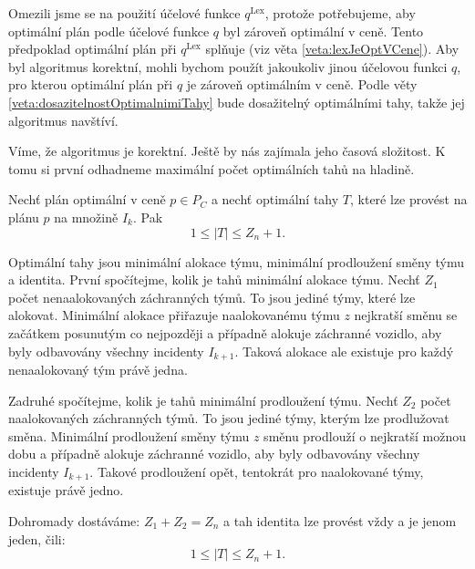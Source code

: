 Omezili jsme se na použití účelové funkce $q^{\text{Lex}}$, protože potřebujeme, aby optimální plán podle účelové funkce $q$ byl zároveň optimální v ceně.
Tento předpoklad optimální plán při $q^{\text{Lex}}$ splňuje (viz věta \ref{veta:lexJeOptVCene}).
Aby byl algoritmus korektní, mohli bychom použít jakoukoliv jinou účelovou funkci $q$, pro kterou optimální plán při $q$ je zároveň optimálním v ceně.
Podle věty \ref{veta:dosazitelnostOptimalnimiTahy} bude dosažitelný optimálními tahy, takže jej algoritmus navštíví.

Víme, že algoritmus je korektní. Ještě by nás zajímala jeho časová složitost.
K tomu si první odhadneme maximální počet optimálních tahů na hladině.
\begin{veta}\label{veta:pocetOptTahu}
  Nechť plán optimální v ceně $p \in P_C$ a nechť optimální tahy $T$, které lze provést na plánu $p$ na množině $I_k$.
  Pak
  \begin{equation*}
    1 \leq |T| \leq Z_n + 1.
  \end{equation*}
\end{veta}
\begin{dukaz}
  Optimální tahy jsou minimální alokace týmu, minimální prodloužení směny týmu a identita.
  První spočítejme, kolik je tahů minimální alokace týmu.
  Nechť $Z_1$ počet nenaalokovaných záchranných týmů.
  To jsou jediné týmy, které lze alokovat.
  Minimální alokace přiřazuje naalokovanému týmu $z$ nejkratší směnu se začátkem posunutým co nejpozději a případně alokuje záchranné vozidlo,
  aby byly odbavovány všechny incidenty $I_{k+1}$.
  Taková alokace ale existuje pro každý nenaalokovaný tým právě jedna.

  Zadruhé spočítejme, kolik je tahů minimální prodloužení týmu.
  Nechť $Z_2$ počet naalokovaných záchranných týmů.
  To jsou jediné týmy, kterým lze prodlužovat směna.
  Minimální prodloužení směny týmu $z$ směnu prodlouží o nejkratší možnou dobu a případně alokuje záchranné vozidlo,
  aby byly odbavovány všechny incidenty $I_{k+1}$.
  Takové prodloužení opět, tentokrát pro naalokované týmy, existuje právě jedno.

  Dohromady dostáváme: $Z_1 + Z_2 = Z_n$ a tah identita lze provést vždy a je jenom jeden, čili:
  \begin{equation*}
    1 \leq |T| \leq Z_n + 1.
  \end{equation*}
\end{dukaz}

